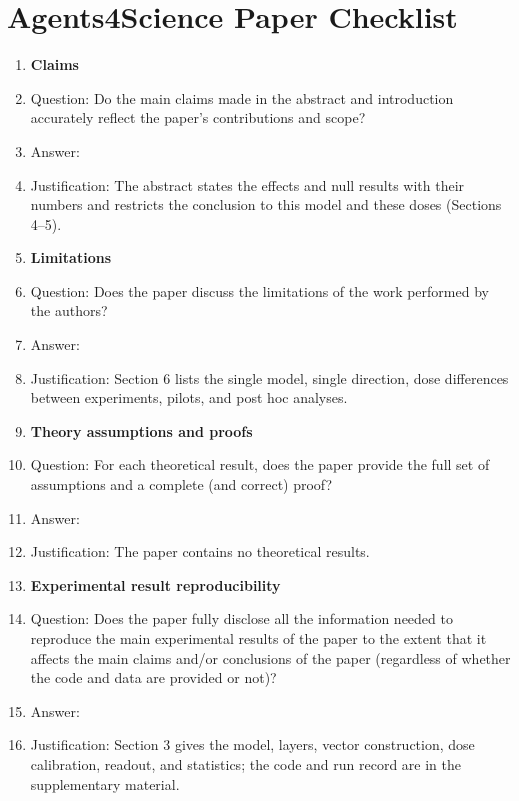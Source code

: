 \documentclass{article}
\begin{document}
\newpage
\section*{Agents4Science Paper Checklist}

\begin{enumerate}

\item {\bf Claims}
    \item[] Question: Do the main claims made in the abstract and introduction accurately reflect the paper's contributions and scope?
    \item[] Answer: \answerYes{}
    \item[] Justification: The abstract states the effects and null results with their numbers and restricts the conclusion to this model and these doses (Sections 4--5).

\item {\bf Limitations}
    \item[] Question: Does the paper discuss the limitations of the work performed by the authors?
    \item[] Answer: \answerYes{}
    \item[] Justification: Section 6 lists the single model, single direction, dose differences between experiments, pilots, and post hoc analyses.

\item {\bf Theory assumptions and proofs}
    \item[] Question: For each theoretical result, does the paper provide the full set of assumptions and a complete (and correct) proof?
    \item[] Answer: \answerNA{}
    \item[] Justification: The paper contains no theoretical results.

\item {\bf Experimental result reproducibility}
    \item[] Question: Does the paper fully disclose all the information needed to reproduce the main experimental results of the paper to the extent that it affects the main claims and/or conclusions of the paper (regardless of whether the code and data are provided or not)?
    \item[] Answer: \answerYes{}
    \item[] Justification: Section 3 gives the model, layers, vector construction, dose calibration, readout, and statistics; the code and run record are in the supplementary material.


\end{enumerate}
\end{document}
